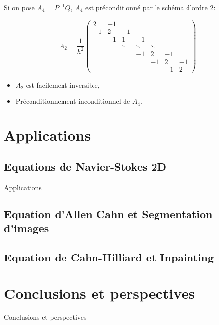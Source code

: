 \documentclass[11pt]{beamer}
\begin{document}
 \begin{frame}
 Si on pose $A_4=P^{-1}Q$, $A_4$ est préconditionné par le schéma d'ordre 2:
 
 $$A_2=\dfrac{1}{h^2} \begin{pmatrix}
2  & -1 &    &   &    &     &   \\ 
-1 & 2 & -1 &   &    &     &   \\ 
   & -1 & 1  & -1&    &     &   \\ 
   &    & \ddots & \ddots & \ddots &   &   \\ 
   &    &   & -1 & 2  & -1   &   \\ 
   &    &   &    & -1 & 2    & -1 \\ 
   &    &   &    &    & -1   & 2
\end{pmatrix}$$

\begin{itemize}
\item $A_2$ est facilement inversible,
\item Préconditionnement inconditionnel de $A_4$.
\end{itemize}
 \end{frame}


\section{Applications}
\subsection{Equations de Navier-Stokes 2D}
\begin{frame}{Applications}

\end{frame}

\subsection{Equation d'Allen Cahn et Segmentation d'images}
\begin{frame}{}

\end{frame}

\subsection{Equation de Cahn-Hilliard et Inpainting}
\begin{frame}{}

\end{frame}
\section{Conclusions et perspectives}
\begin{frame}{Conclusions et perspectives}

\end{frame}
\end{document}
